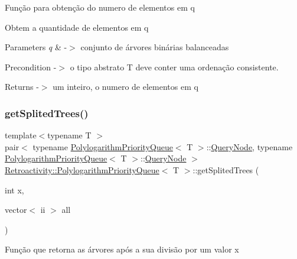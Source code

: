 Função para obtenção do numero de elementos em q

Obtem a quantidade de elementos em q


\begin{DoxyParams}{Parameters}
{\em q} & -\/$>$ conjunto de árvores binárias balanceadas \\
\hline
\end{DoxyParams}
\begin{DoxyPrecond}{Precondition}
-\/$>$ o tipo abstrato T deve conter uma ordenação consistente. 
\end{DoxyPrecond}
\begin{DoxyReturn}{Returns}
-\/$>$ um inteiro, o numero de elementos em q 
\end{DoxyReturn}
\mbox{\label{classRetroactivity_1_1PolylogarithmPriorityQueue_acb5b4bb0403f953cae696fdd2db2e1e0}} 
\subsubsection{\texorpdfstring{get\+Splited\+Trees()}{getSplitedTrees()}}
{\footnotesize\ttfamily template$<$typename T $>$ \\
pair$<$ typename \hyperlink{classRetroactivity_1_1PolylogarithmPriorityQueue}{Polylogarithm\+Priority\+Queue}$<$ T $>$\+::\hyperlink{classRetroactivity_1_1PolylogarithmPriorityQueue_1_1QueryNode}{Query\+Node}, typename \hyperlink{classRetroactivity_1_1PolylogarithmPriorityQueue}{Polylogarithm\+Priority\+Queue}$<$ T $>$\+::\hyperlink{classRetroactivity_1_1PolylogarithmPriorityQueue_1_1QueryNode}{Query\+Node} $>$ \hyperlink{classRetroactivity_1_1PolylogarithmPriorityQueue}{Retroactivity\+::\+Polylogarithm\+Priority\+Queue}$<$ T $>$\+::get\+Splited\+Trees (\begin{DoxyParamCaption}\item[{int}]{x,  }\item[{vector$<$ ii $>$}]{all }\end{DoxyParamCaption})}

Função que retorna as árvores após a sua divisão por um valor x


